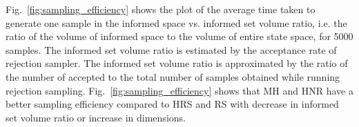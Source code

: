 \documentclass[letterpaper, 10 pt, conference]{ieeeconf}  %
\begin{document}
Fig.~\ref{fig:sampling_efficiency} shows the plot of the average time taken to generate one sample in the informed space vs. informed set volume ratio, i.e. the ratio of the volume of informed space to the volume of entire state space, for 5000 samples. 
The informed set volume ratio is estimated by the acceptance rate of rejection sampler.
The informed set volume ratio is approximated by the ratio of the number of accepted to the total number of samples obtained while running rejection sampling. 
Fig.~\ref{fig:sampling_efficiency} shows that MH and HNR have a better sampling efficiency compared to HRS and RS with decrease in informed set volume ratio or increase in dimensions. 
\end{document}
